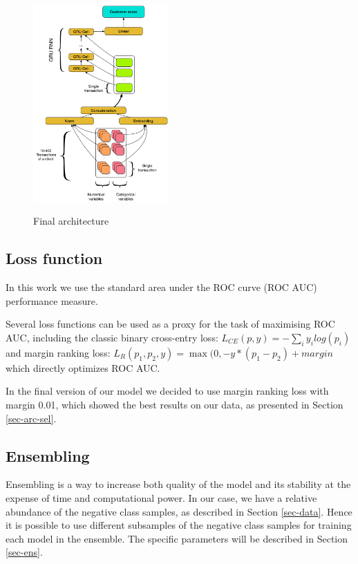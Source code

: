 \documentclass[sigconf]{acmart}
\begin{document}
\begin{figure}[ht]
  \caption{Final architecture}
  \includegraphics[width=0.46\textwidth]{figures/architecture.pdf}
  \label{fig-arch}
\end{figure}

\subsection{Loss function}

In this work we use the standard area under the ROC curve (ROC AUC) performance measure.

Several loss functions can be used as a proxy for the task of maximising ROC AUC, including the classic binary cross-entry loss: $L_{CE}(p, y) = - \sum_i y_ilog(p_i)$ and margin ranking loss: $ L_R(p_1, p_2, y) = \max(0, -y * (p_1 - p_2) + margin $ which directly optimizes ROC AUC.

In the final version of our model we decided to use margin ranking loss with margin 0.01, which showed the best results on our data, as presented in Section \ref{sec-arc-sel}.

\subsection{Ensembling} \label{sec-method-ens}

Ensembling \cite{breiman1996bagging} is a way to increase both quality of the model and its stability at the expense of time and computational power. In our case, we have a relative abundance of the negative class samples, as described in Section \ref{sec-data}. Hence it is possible to use different subsamples of the negative class samples for training each model in the ensemble. The specific parameters will be described in Section \ref{sec-ens}.
\end{document}
